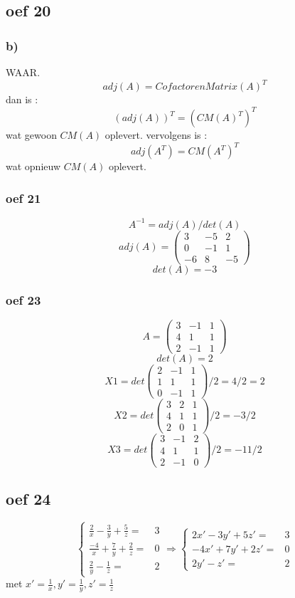 \documentclass[lineaire_algebra_oplossingen.tex]{subfiles}
\begin{document}
\subsection{oef 20}
\subsubsection*{b)}

WAAR.
\[
adj(A) = CofactorenMatrix(A)^T
\]
dan is : 
\[
(adj(A))^T = (CM(A)^T)^T
\]
wat gewoon $CM(A)$ oplevert.
vervolgens is : 
\[
adj(A^T) = CM(A^T)^T
\]
wat opnieuw $CM(A)$ oplevert.


\subsubsection*{oef 21}
\[A^{-1} = adj(A)/det(A)\]
\[adj(A) =
\begin{pmatrix}
3 & -5 & 2\\
0 & -1 & 1\\
-6 & 8 & -5
\end{pmatrix} 
\]
\[det(A)=-3\]

\subsubsection*{oef 23}
\[ A = 
\begin{pmatrix}
3 & -1 & 1\\
4 & 1 & 1\\
2 & -1 & 1
\end{pmatrix}
\]
\[ det(A) = 2\]
\[X1 = det 
\begin{pmatrix}
2 & -1 & 1\\
1 & 1 & 1\\
0 & -1 & 1
\end{pmatrix}
/2 = 4/2 = 2 \]
\[X2 = det
\begin{pmatrix}
3 & 2 & 1\\
4 & 1 & 1\\
2 & 0 & 1
\end{pmatrix}
/2 = -3/2 \]
\[X3 = det
\begin{pmatrix}
3 & -1 & 2\\
4 & 1 & 1\\
2 & -1 & 0
\end{pmatrix}
/2 = -11/2 \]

\subsection{oef 24}
\[ \left\{
     \begin{array}{lr}
       \frac{2}{x}-\frac{3}{y}+\frac{5}{z} = & 3 \\
       \frac{-4}{x}+\frac{7}{y}+\frac{2}{z} = & 0 \\
       \frac{2}{y}-\frac{1}{z} = & 2
     \end{array}
   \right. \Rightarrow\left\{
     \begin{array}{lr}
       2x'-3y'+5z' = & 3 \\
       -4x'+7y'+2z' = & 0 \\
       2y'-z' = & 2
     \end{array}
   \right.
\]
met $x' = \frac{1}{x}, y' = \frac{1}{y}, z' = \frac{1}{z}$
\end{document}

